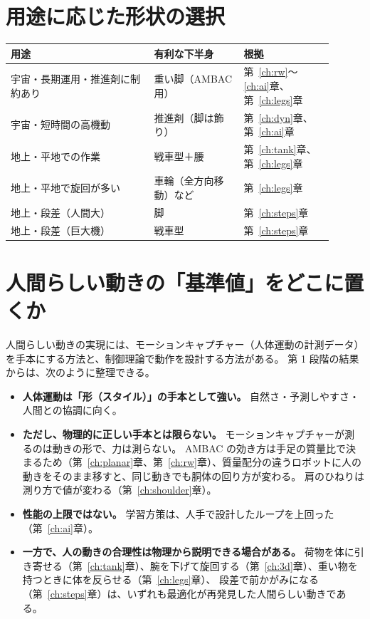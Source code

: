 \section{用途に応じた形状の選択}

\begin{longtable}{p{0.40\linewidth}p{0.25\linewidth}p{0.25\linewidth}}
\toprule
用途 & 有利な下半身 & 根拠 \\ \midrule \endhead
宇宙・長期運用・推進剤に制約あり & 重い脚（AMBAC 用） & 第~\ref{ch:rw}〜\ref{ch:ai}章、第~\ref{ch:legs}章 \\
宇宙・短時間の高機動 & 推進剤（脚は飾り） & 第~\ref{ch:dyn}章、第~\ref{ch:ai}章 \\
地上・平地での作業 & 戦車型＋腰 & 第~\ref{ch:tank}章、第~\ref{ch:legs}章 \\
地上・平地で旋回が多い & 車輪（全方向移動）など & 第~\ref{ch:legs}章 \\
地上・段差（人間大） & 脚 & 第~\ref{ch:steps}章 \\
地上・段差（巨大機） & 戦車型 & 第~\ref{ch:steps}章 \\
\bottomrule
\end{longtable}

\section{人間らしい動きの「基準値」をどこに置くか}

人間らしい動きの実現には、モーションキャプチャー（人体運動の計測データ）を手本にする方法と、制御理論で動作を設計する方法がある。
第 1 段階の結果からは、次のように整理できる。

\begin{itemize}
\item \textbf{人体運動は「形（スタイル）」の手本として強い。} 自然さ・予測しやすさ・人間との協調に向く。
\item \textbf{ただし、物理的に正しい手本とは限らない。} モーションキャプチャーが測るのは動きの形で、力は測らない。
  AMBAC の効き方は手足の質量比で決まるため（第~\ref{ch:planar}章、第~\ref{ch:rw}章）、質量配分の違うロボットに人の動きをそのまま移すと、同じ動きでも胴体の回り方が変わる。
  肩のひねりは測り方で値が変わる（第~\ref{ch:shoulder}章）。
\item \textbf{性能の上限ではない。} 学習方策は、人手で設計したループを上回った（第~\ref{ch:ai}章）。
\item \textbf{一方で、人の動きの合理性は物理から説明できる場合がある。}
  荷物を体に引き寄せる（第~\ref{ch:tank}章）、腕を下げて旋回する（第~\ref{ch:3d}章）、重い物を持つときに体を反らせる（第~\ref{ch:legs}章）、
  段差で前かがみになる（第~\ref{ch:steps}章）は、いずれも最適化が再発見した人間らしい動きである。
\end{itemize}

